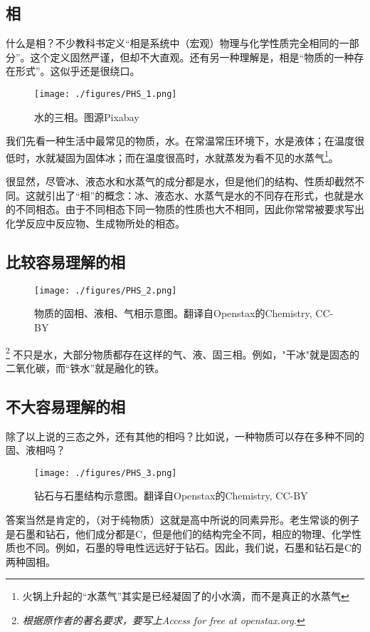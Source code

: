 
\subsection{相}
什么是相？不少教科书定义“相是系统中（宏观）物理与化学性质完全相同的一部分”。这个定义固然严谨，但却不大直观。还有另一种理解是，相是“物质的一种存在形式”。这似乎还是很绕口。

\begin{figure}[ht]
\centering
\texttt{[image: ./figures/PHS\_1.png]}
\caption{水的三相。图源Pixabay} \label{PHS_fig1}
\end{figure}
我们先看一种生活中最常见的物质，水。在常温常压环境下，水是液体；在温度很低时，水就凝固为固体冰；而在温度很高时，水就蒸发为看不见的水蒸气\footnote{火锅上升起的“水蒸气”其实是已经凝固了的小水滴，而不是真正的水蒸气}。

很显然，尽管冰、液态水和水蒸气的成分都是水，但是他们的结构、性质却截然不同。这就引出了“相”的概念：冰、液态水、水蒸气是水的不同存在形式，也就是水的不同相态。由于不同相态下同一物质的性质也大不相同，因此你常常被要求写出化学反应中反应物、生成物所处的相态。

\subsection{比较容易理解的相}
\begin{figure}[ht]
\centering
\texttt{[image: ./figures/PHS\_2.png]}
\caption{物质的固相、液相、气相示意图。翻译自Openstax的Chemistry, CC-BY} \label{PHS_fig2}
\end{figure}
\footnote{\textsl{根据原作者的著名要求，要写上Access for free at openstax.org.}}
不只是水，大部分物质都存在这样的气、液、固三相。例如，"干冰"就是固态的二氧化碳，而“铁水”就是融化的铁。

\subsection{不大容易理解的相}
除了以上说的三态之外，还有其他的相吗？比如说，一种物质可以存在多种不同的固、液相吗？

\begin{figure}[ht]
\centering
\texttt{[image: ./figures/PHS\_3.png]}
\caption{钻石与石墨结构示意图。翻译自Openstax的Chemistry, CC-BY} \label{PHS_fig3}
\end{figure}
答案当然是肯定的，（对于纯物质）这就是高中所说的同素异形。老生常谈的例子是石墨和钻石，他们成分都是C，但是他们的结构完全不同，相应的物理、化学性质也不同。例如，石墨的导电性远远好于钻石。因此，我们说，石墨和钻石是C的两种固相。

